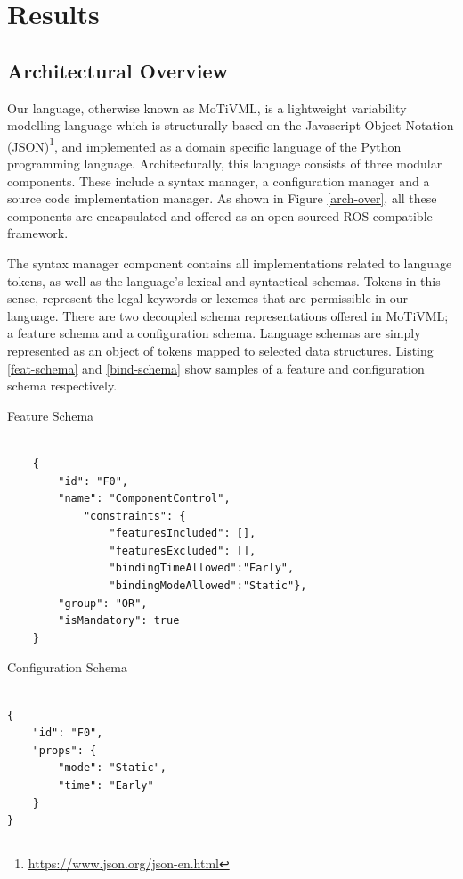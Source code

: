 \documentclass[conference]{IEEEtran}
\newcommand{\foot}[1]{\footnote{\url{#1}}}
\begin{document}
\section{Results}
\subsection{Architectural Overview}
Our language, otherwise known as MoTiVML, is a lightweight variability modelling language which is structurally based on the Javascript Object Notation (JSON)\foot{https://www.json.org/json-en.html}, and implemented as a domain specific language of the Python programming language. Architecturally, this language consists of three modular components. These include a syntax manager, a configuration manager and a source code implementation manager. As shown in Figure \ref{arch-over}, all these components are encapsulated and offered as an open sourced ROS compatible framework.

The syntax manager component contains all implementations related to language tokens, as well as the language's lexical and syntactical schemas. Tokens in this sense, represent the legal keywords or lexemes that are permissible in our language. There are two decoupled schema representations offered in MoTiVML; a feature schema and a configuration schema. Language schemas are simply represented as an object of tokens mapped to selected data structures. Listing \ref{feat-schema} and \ref{bind-schema} show samples of a feature and configuration schema respectively.

\begin{listing}[H]
\caption{Feature Schema}
\begin{verbatim}

    {
        "id": "F0",
        "name": "ComponentControl",
            "constraints": {
	            "featuresIncluded": [],
	            "featuresExcluded": [],
	            "bindingTimeAllowed":"Early",
	            "bindingModeAllowed":"Static"},
        "group": "OR",
        "isMandatory": true
    }

\end{verbatim}
\label{feat-schema}
\end{listing}

\begin{listing}[H]
\caption{Configuration Schema}
\begin{verbatim}

{
    "id": "F0",
    "props": {
        "mode": "Static",
        "time": "Early"
    }
}
\end{verbatim}
\label{bind-schema}
\end{listing}
\end{document}
